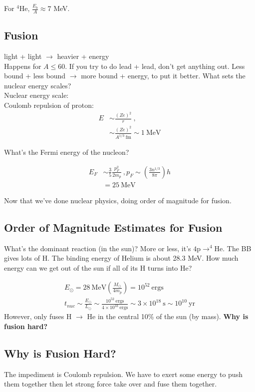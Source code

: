 \documentclass[10pt,letterpaper,final]{book}
\newcommand{\ra}{\rightarrow}
\begin{document}
For $^4$He, $\frac{E_b}{A} \approx 7$ MeV. 

\subsection{Fusion}
light + light $\rightarrow$ heavier + energy\\
Happens for $A \leq 60$. If you try to do lead + lead, don't get anything out. Less bound + less bound $\ra$ more bound + energy, to put it better. What sets the nuclear energy scales? \\

Nuclear energy scale:\\
Coulomb repulsion of proton:\\
\begin{align}
E & \sim \frac{(Ze)^2}{r}~,\\
& \sim \frac{(Ze)^2}{A^{1/3} ~ \text{fm}} \sim 1 ~ \text{MeV}
\end{align}

What's the Fermi energy of the nucleon?

\begin{align}
E_F & \sim \frac{3}{5} \frac{p_F^2}{2 m_p}~, p_F \sim \left( \frac{3 n^{1/3}}{8 \pi} \right) h\\
& = 25 ~\text{MeV}
\end{align}

Now that we've done nuclear physics, doing order of magnitude for fusion.

\subsection{Order of Magnitude Estimates for Fusion}

What's the dominant reaction (in the sun)? More or less, it's $4 \text{p} \ra ^4$He. The BB gives lots of H. The binding energy of Helium is about 28.3 MeV. How much energy can we get out of the sun if all of its H turns into He? 

\begin{align}
E_\odot = 28~\text{MeV} \left( \frac{M_\odot}{4m_p} \right) = 10^{52} ~\text{ergs}\\
t_{nuc} \sim \frac{E_\odot}{L_\odot} \sim \frac{10^{52}~\text{ergs}}{4 \times 10^{33} ~\text{ergs}} \sim 3 \times 10^{18} ~ \text{s} \sim 10^{10} ~ \text{yr}
\end{align}
However,  only fuses H $\ra$ He in the central 10\% of the sun (by mass). \textbf{Why is fusion hard?}

\subsection{Why is Fusion Hard?}
The impediment is Coulomb repulsion. We have to exert some energy to push them together then let strong force take over and fuse them together. \\
\end{document}
